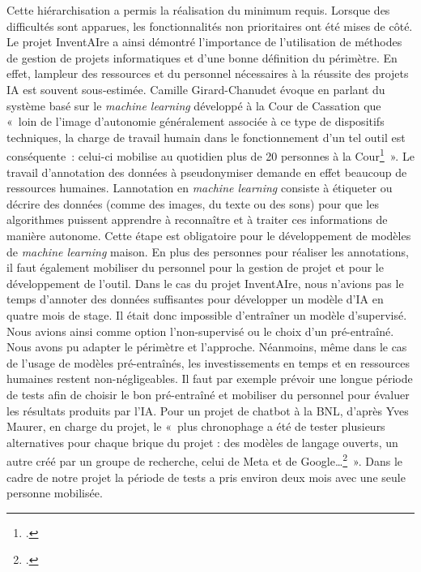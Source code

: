 Cette hiérarchisation a permis la réalisation du minimum requis. Lorsque
des difficultés sont apparues, les fonctionnalités non prioritaires ont
été mises de côté. Le projet InventAIre a ainsi démontré l'importance de
l'utilisation de méthodes de gestion de projets informatiques et d'une
bonne définition du périmètre. En effet,
l\textquotesingle ampleur des ressources et du personnel nécessaires à
la réussite des projets IA est souvent sous-estimée. Camille Girard-Chanudet évoque en parlant du
système basé sur le \emph{machine learning} développé à la Cour de Cassation
que «~loin de l'image d'autonomie généralement associée à ce type de
dispositifs techniques, la charge de travail humain dans le
fonctionnement d'un tel outil est conséquente~: celui-ci mobilise au
quotidien plus de 20 personnes à la Cour\footcite{girard-chanudet_travail_2023}~».
Le travail d'annotation des données à pseudonymiser demande en effet
beaucoup de ressources humaines. L\textquotesingle annotation en
\emph{machine learning} consiste à étiqueter ou décrire des données
(comme des images, du texte ou des sons) pour que les algorithmes
puissent apprendre à reconnaître et à traiter ces informations de
manière autonome. Cette étape est obligatoire pour le développement de modèles de \emph{machine
	learning} maison. En plus des personnes pour
réaliser les annotations, il faut également mobiliser du personnel pour
la gestion de projet et pour le développement de l'outil. Dans le cas du
projet InventAIre, nous n'avions pas le temps d'annoter des données
suffisantes pour développer un modèle d'IA en quatre mois de stage. Il
était donc impossible d'entraîner un modèle d'\gls{supervisé}. Nous avions ainsi 
comme option
l'\gls{non-supervisé} ou le choix d'un \gls{pré-entraîné}. Nous avons pu adapter le périmètre et
l'approche. Néanmoins, même dans le cas de l'usage de modèles
pré-entraînés, les investissements en temps et en ressources humaines
restent non-négligeables. Il faut par exemple prévoir une longue période
de tests afin de choisir le bon \gls{pré-entraîné} et mobiliser du personnel pour évaluer les résultats produits par l'IA. Pour un projet de
\gls{chatbot} à la BNL, d'après Yves Maurer, en charge du projet, le
«~plus chronophage a été de tester plusieurs alternatives pour chaque
brique du projet : des modèles de langage ouverts, un autre créé par
un groupe de recherche, celui de Meta et de Google\ldots \footcite{noauthor_comment_nodate}~». Dans le
	cadre de notre projet la période de tests a pris environ deux mois  avec une seule personne mobilisée. 


